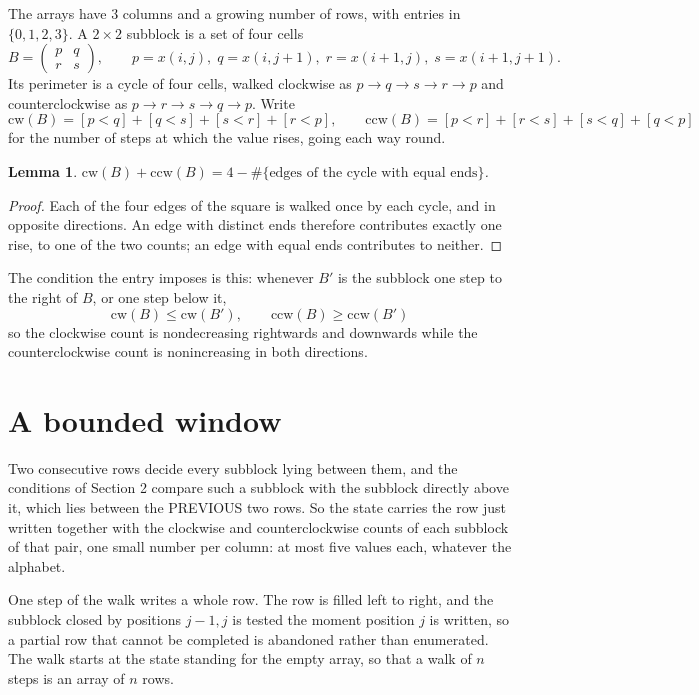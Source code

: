 \documentclass[11pt,a4paper]{article}
\theoremstyle{plain}
\newtheorem{lemma}[theorem]{Lemma}
\theoremstyle{definition}
\begin{document}
The arrays have $3$ columns and a growing number of rows, with entries in $\{0,1,2,3\}$. A
$2\times2$ subblock is a set of four cells
\[
B=\begin{pmatrix} p & q \\ r & s \end{pmatrix},
\qquad p=x(i,j),\; q=x(i,j+1),\; r=x(i+1,j),\; s=x(i+1,j+1).
\]
Its perimeter is a cycle of four cells, walked clockwise as $p\to q\to s\to r\to p$ and
counterclockwise as $p\to r\to s\to q\to p$. Write
\[
\mathrm{cw}(B)=[p<q]+[q<s]+[s<r]+[r<p],\qquad
\mathrm{ccw}(B)=[p<r]+[r<s]+[s<q]+[q<p]
\]
for the number of steps at which the value rises, going each way round.

\begin{lemma}\label{lem:sum}
$\mathrm{cw}(B)+\mathrm{ccw}(B)=4-\#\{\text{edges of the cycle with equal ends}\}$.
\end{lemma}

\begin{proof}
Each of the four edges of the square is walked once by each cycle, and in opposite directions.
An edge with distinct ends therefore contributes exactly one rise, to one of the two counts;
an edge with equal ends contributes to neither.
\end{proof}

The condition the entry imposes is this: whenever $B'$ is the subblock one step to the right of $B$, or one step below it, 
\[
\mathrm{cw}(B)\le\mathrm{cw}(B'),\qquad \mathrm{ccw}(B)\ge\mathrm{ccw}(B')
\]
so the clockwise count is nondecreasing rightwards and downwards while the counterclockwise count is nonincreasing in both directions.

\section{A bounded window}

Two consecutive rows decide every subblock lying between them, and the conditions of Section 2 compare such a subblock with the subblock directly above it, which lies between the PREVIOUS two rows. So the state carries the row just written together with the clockwise and counterclockwise counts of each subblock of that pair, one small number per column: at most five values each, whatever the alphabet.

One step of the walk writes a whole row. The row is filled left to right, and the subblock
closed by positions $j-1,j$ is tested the moment position $j$ is written, so a partial row that
cannot be completed is abandoned rather than enumerated. The walk starts at the state standing
for the empty array, so that a walk of $n$ steps is an array of $n$ rows.
\end{document}
